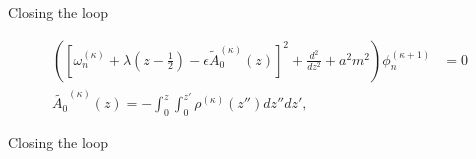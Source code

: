 \begin{frame}{Closing the loop}

\begin{align}
			\left(
				\left[ 
			\omega^{\left( \kappa \right) }_n 
	+ \lambda \left( z - \frac{1}{2} \right) 
- \epsilon \tilde{A}^{\left(\kappa  \right) }_0(z)  \right]^2 
	+ \frac{d^2}{dz^2} + a^2m^2  \right)
	\phi^{\left( \kappa + 1 \right) }_n &= 0 \\
	\tilde{A_0}^{(\kappa)}(z) = -\int_{0}^{z} \int_{0}^{z'} \rho^{(\kappa)}(z'')dz''   dz'
,
\end{align}
\end{frame}

\begin{frame}{Closing the loop}
	
\end{frame}

